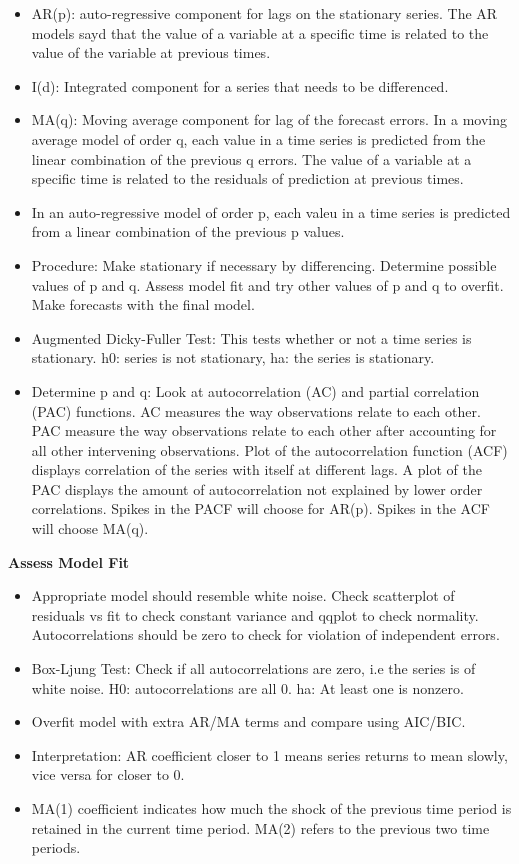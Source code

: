 \documentclass[]{book}
\theoremstyle{definition}
\theoremstyle{definition}
\theoremstyle{definition}
\theoremstyle{remark}
\begin{document}
\begin{itemize}
\item
  AR(p): auto-regressive component for lags on the stationary series.
  The AR models sayd that the value of a variable at a specific time is
  related to the value of the variable at previous times.
\item
  I(d): Integrated component for a series that needs to be differenced.
\item
  MA(q): Moving average component for lag of the forecast errors. In a
  moving average model of order q, each value in a time series is
  predicted from the linear combination of the previous q errors. The
  value of a variable at a specific time is related to the residuals of
  prediction at previous times.
\item
  In an auto-regressive model of order p, each valeu in a time series is
  predicted from a linear combination of the previous p values.
\item
  Procedure: Make stationary if necessary by differencing. Determine
  possible values of p and q. Assess model fit and try other values of p
  and q to overfit. Make forecasts with the final model.
\item
  Augmented Dicky-Fuller Test: This tests whether or not a time series
  is stationary. h0: series is not stationary, ha: the series is
  stationary.
\item
  Determine p and q: Look at autocorrelation (AC) and partial
  correlation (PAC) functions. AC measures the way observations relate
  to each other. PAC measure the way observations relate to each other
  after accounting for all other intervening observations. Plot of the
  autocorrelation function (ACF) displays correlation of the series with
  itself at different lags. A plot of the PAC displays the amount of
  autocorrelation not explained by lower order correlations. Spikes in
  the PACF will choose for AR(p). Spikes in the ACF will choose MA(q).
\end{itemize}

\textbf{Assess Model Fit}

\begin{itemize}
\item
  Appropriate model should resemble white noise. Check scatterplot of
  residuals vs fit to check constant variance and qqplot to check
  normality. Autocorrelations should be zero to check for violation of
  independent errors.
\item
  Box-Ljung Test: Check if all autocorrelations are zero, i.e the series
  is of white noise. H0: autocorrelations are all 0. ha: At least one is
  nonzero.
\item
  Overfit model with extra AR/MA terms and compare using AIC/BIC.
\item
  Interpretation: AR coefficient closer to 1 means series returns to
  mean slowly, vice versa for closer to 0.
\item
  MA(1) coefficient indicates how much the shock of the previous time
  period is retained in the current time period. MA(2) refers to the
  previous two time periods.
\end{itemize}
\end{document}
